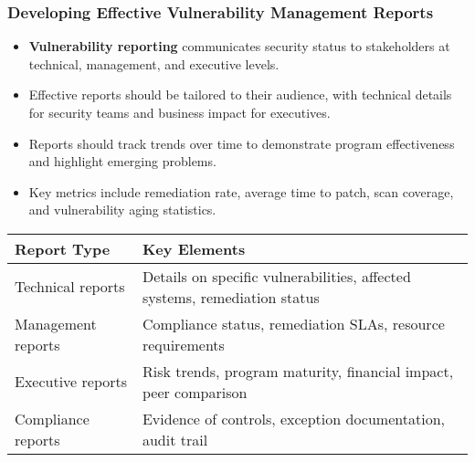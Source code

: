 \documentclass{beamer}
\begin{document}
    \begin{frame}
        \frametitle{Developing Effective Vulnerability Management Reports}
        \begin{itemize}
            \item \textbf{Vulnerability reporting} communicates security status to stakeholders at technical, management, and executive levels.
            \item Effective reports should be tailored to their audience, with technical details for security teams and business impact for executives.
            \item Reports should track trends over time to demonstrate program effectiveness and highlight emerging problems.
            \item Key metrics include remediation rate, average time to patch, scan coverage, and vulnerability aging statistics.
        \end{itemize}
        
        \begin{table}
        \scriptsize
        \centering
        \begin{tabular}{p{4cm}p{7cm}}
        \toprule
        \textbf{Report Type} & \textbf{Key Elements} \\
        \midrule
        Technical reports & Details on specific vulnerabilities, affected systems, remediation status \\
        Management reports & Compliance status, remediation SLAs, resource requirements \\
        Executive reports & Risk trends, program maturity, financial impact, peer comparison \\
        Compliance reports & Evidence of controls, exception documentation, audit trail \\
        \bottomrule
        \end{tabular}
        \end{table}
        \end{frame}
        
\end{document}
